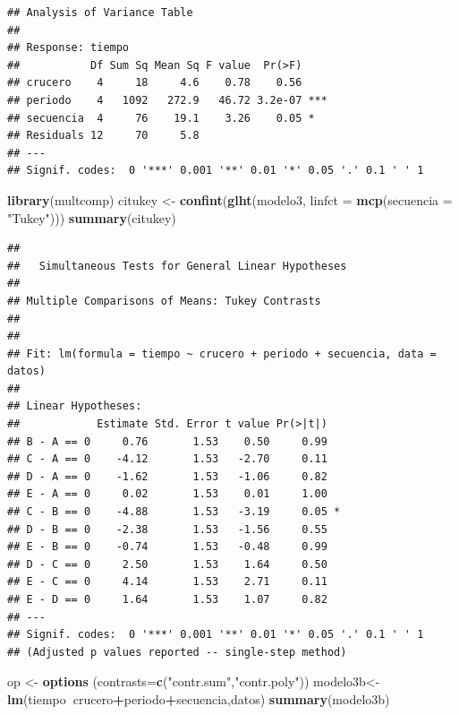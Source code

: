 \documentclass[]{book}
\newenvironment{Shaded}{\begin{snugshade}}{\end{snugshade}}
\newcommand{\KeywordTok}[1]{\textcolor[rgb]{0.13,0.29,0.53}{\textbf{#1}}}
\newcommand{\DataTypeTok}[1]{\textcolor[rgb]{0.13,0.29,0.53}{#1}}
\newcommand{\StringTok}[1]{\textcolor[rgb]{0.31,0.60,0.02}{#1}}
\newcommand{\OperatorTok}[1]{\textcolor[rgb]{0.81,0.36,0.00}{\textbf{#1}}}
\newcommand{\NormalTok}[1]{#1}
\begin{document}
\begin{verbatim}
## Analysis of Variance Table
## 
## Response: tiempo
##           Df Sum Sq Mean Sq F value  Pr(>F)    
## crucero    4     18     4.6    0.78    0.56    
## periodo    4   1092   272.9   46.72 3.2e-07 ***
## secuencia  4     76    19.1    3.26    0.05 *  
## Residuals 12     70     5.8                    
## ---
## Signif. codes:  0 '***' 0.001 '**' 0.01 '*' 0.05 '.' 0.1 ' ' 1
\end{verbatim}

\begin{Shaded}
\begin{Highlighting}[]
\KeywordTok{library}\NormalTok{(multcomp)}
\NormalTok{citukey <-}\StringTok{ }\KeywordTok{confint}\NormalTok{(}\KeywordTok{glht}\NormalTok{(modelo3, }\DataTypeTok{linfct =} \KeywordTok{mcp}\NormalTok{(}\DataTypeTok{secuencia =} \StringTok{"Tukey"}\NormalTok{)))}
\KeywordTok{summary}\NormalTok{(citukey)}
\end{Highlighting}
\end{Shaded}

\begin{verbatim}
## 
##   Simultaneous Tests for General Linear Hypotheses
## 
## Multiple Comparisons of Means: Tukey Contrasts
## 
## 
## Fit: lm(formula = tiempo ~ crucero + periodo + secuencia, data = datos)
## 
## Linear Hypotheses:
##            Estimate Std. Error t value Pr(>|t|)  
## B - A == 0     0.76       1.53    0.50     0.99  
## C - A == 0    -4.12       1.53   -2.70     0.11  
## D - A == 0    -1.62       1.53   -1.06     0.82  
## E - A == 0     0.02       1.53    0.01     1.00  
## C - B == 0    -4.88       1.53   -3.19     0.05 *
## D - B == 0    -2.38       1.53   -1.56     0.55  
## E - B == 0    -0.74       1.53   -0.48     0.99  
## D - C == 0     2.50       1.53    1.64     0.50  
## E - C == 0     4.14       1.53    2.71     0.11  
## E - D == 0     1.64       1.53    1.07     0.82  
## ---
## Signif. codes:  0 '***' 0.001 '**' 0.01 '*' 0.05 '.' 0.1 ' ' 1
## (Adjusted p values reported -- single-step method)
\end{verbatim}

\begin{Shaded}
\begin{Highlighting}[]
\NormalTok{op <-}\StringTok{ }\KeywordTok{options}\NormalTok{ (}\DataTypeTok{contrasts=}\KeywordTok{c}\NormalTok{(}\StringTok{"contr.sum"}\NormalTok{,}\StringTok{"contr.poly"}\NormalTok{))}
\NormalTok{modelo3b<-}\KeywordTok{lm}\NormalTok{(tiempo}\OperatorTok{~}\NormalTok{crucero}\OperatorTok{+}\NormalTok{periodo}\OperatorTok{+}\NormalTok{secuencia,datos)}
\KeywordTok{summary}\NormalTok{(modelo3b)}
\end{Highlighting}
\end{Shaded}
\end{document}
